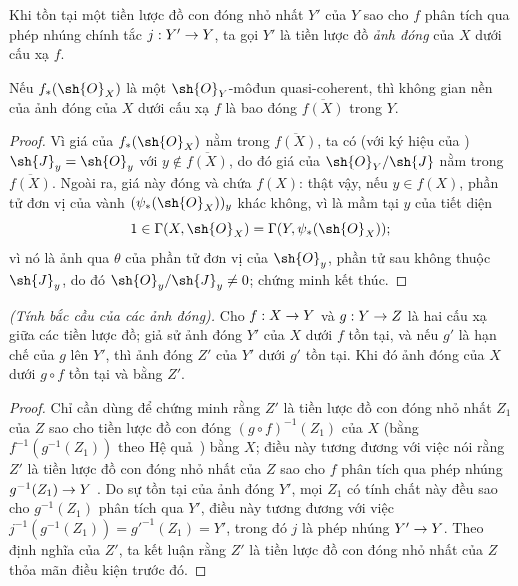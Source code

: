 \documentclass[oneside]{amsart}
\makeatletter
\newcommand{\ega@arrow}[2]{\mathchoice{#1}{#2}{#2}{#2}}
\renewcommand{\to}{\ega@arrow{\longrightarrow}{\rightarrow}}
\let\EGAOriginalLabel\label
\renewcommand{\label}[1]{\phantomsection\EGAOriginalLabel{#1}}
\makeatother
\begin{document}
\begin{definition}[9.5.3]
\label{I.9.5.3}
Khi tồn tại một tiền lược đồ con đóng nhỏ nhất $Y'$ của $Y$ sao cho $f$ phân tích qua
phép nhúng chính tắc $j:Y'\to Y$, ta gọi $Y'$ là tiền lược đồ
\emph{ảnh đóng} của $X$ dưới cấu xạ $f$.
\end{definition}

\begin{proposition}[9.5.4]
\label{I.9.5.4}
Nếu $f_*(\sh{O}_X)$ là một $\sh{O}_Y$-môđun quasi-coherent, thì không gian nền của
ảnh đóng của $X$ dưới cấu xạ $f$ là bao đóng $\overline{f(X)}$ trong $Y$.
\end{proposition}

\begin{proof}
Vì giá của $f_*(\sh{O}_X)$ nằm trong $\overline{f(X)}$, ta có (với ký hiệu của
) $\sh{J}_y=\sh{O}_y$ với $y\not\in\overline{f(X)}$, do đó giá của
$\sh{O}_Y/\sh{J}$ nằm trong $\overline{f(X)}$. Ngoài ra, giá này đóng và chứa
$f(X)$: thật vậy, nếu $y\in f(X)$, phần tử đơn vị của vành
$(\psi_*(\sh{O}_X))_y$ khác không, vì là mầm tại $y$ của tiết diện
\[
  1\in\Gamma(X,\sh{O}_X)=\Gamma(Y,\psi_*(\sh{O}_X));
\]
vì nó là ảnh qua $\theta$ của phần tử đơn vị của $\sh{O}_y$, phần tử sau không
thuộc $\sh{J}_y$, do đó $\sh{O}_y/\sh{J}_y\neq 0$; chứng minh kết thúc.
\end{proof}

\begin{proposition}[9.5.5]
\label{I.9.5.5}
\emph{(Tính bắc cầu của các ảnh đóng).} Cho $f:X\to Y$ và $g:Y\to Z$ là hai cấu xạ
giữa các tiền lược đồ; giả sử ảnh đóng $Y'$ của $X$ dưới $f$ tồn tại, và nếu $g'$ là
hạn chế của $g$ lên $Y'$, thì ảnh đóng $Z'$ của $Y'$ dưới $g'$ tồn tại. Khi đó ảnh đóng
của $X$ dưới $g\circ f$ tồn tại và bằng $Z'$.
\end{proposition}

\begin{proof}
Chỉ cần dùng  để chứng minh rằng $Z'$ là tiền lược đồ con đóng nhỏ nhất
$Z_1$ của $Z$ sao cho tiền lược đồ con đóng $(g\circ f)^{-1}(Z_1)$ của $X$
(bằng $f^{-1}(g^{-1}(Z_1))$ theo Hệ quả~) bằng $X$; điều này tương đương
với việc nói rằng $Z'$ là tiền lược đồ con đóng nhỏ nhất của $Z$ sao cho $f$ phân tích qua
phép nhúng $g^{-1}(Z_1)\to Y$ . Do sự tồn tại của ảnh đóng $Y'$, mọi $Z_1$
có tính chất này đều sao cho $g^{-1}(Z_1)$ phân tích qua $Y'$, điều này tương đương với
việc $j^{-1}(g^{-1}(Z_1))=g'^{-1}(Z_1)=Y'$, trong đó $j$ là phép nhúng $Y'\to Y$.
Theo định nghĩa của $Z'$, ta kết luận rằng $Z'$ là tiền lược đồ con đóng nhỏ nhất của $Z$
thỏa mãn điều kiện trước đó.
\end{proof}
\end{document}
